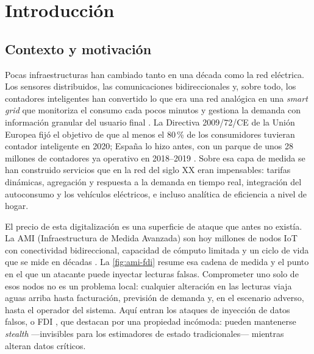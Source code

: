 \chapter{Introducción}
\label{cap:introduccion}

\section{Contexto y motivación}
\label{sec:contexto}

Pocas infraestructuras han cambiado tanto en una década como la red eléctrica. Los sensores distribuidos, las comunicaciones bidireccionales y, sobre todo, los contadores inteligentes han convertido lo que era una red analógica en una \textit{smart grid} que monitoriza el consumo cada pocos minutos y gestiona la demanda con información granular del usuario final \cite{fang2012smartgrid,gungor2011smartgrid}. La Directiva 2009/72/CE de la Unión Europea fijó el objetivo de que al menos el 80\,\% de los consumidores tuvieran contador inteligente en 2020; España lo hizo antes, con un parque de unos 28 millones de contadores ya operativo en 2018--2019 \cite{cnmc2019contadores}. Sobre esa capa de medida se han construido servicios que en la red del siglo XX eran impensables: tarifas dinámicas, agregación y respuesta a la demanda en tiempo real, integración del autoconsumo y los vehículos eléctricos, e incluso analítica de eficiencia a nivel de hogar.

El precio de esta digitalización es una superficie de ataque que antes no existía. La AMI (Infraestructura de Medida Avanzada) son hoy millones de nodos IoT con conectividad bidireccional, capacidad de cómputo limitada y un ciclo de vida que se mide en décadas \cite{mclaughlin2016cybersecurity}. La \cref{fig:ami-fdi} resume esa cadena de medida y el punto en el que un atacante puede inyectar lecturas falsas. Comprometer uno solo de esos nodos no es un problema local: cualquier alteración en las lecturas viaja aguas arriba hasta facturación, previsión de demanda y, en el escenario adverso, hasta el operador del sistema. Aquí entran los ataques de inyección de datos falsos, o FDI \cite{liu2009fdi}, que destacan por una propiedad incómoda: pueden mantenerse \emph{stealth} ---invisibles para los estimadores de estado tradicionales--- mientras alteran datos críticos.

